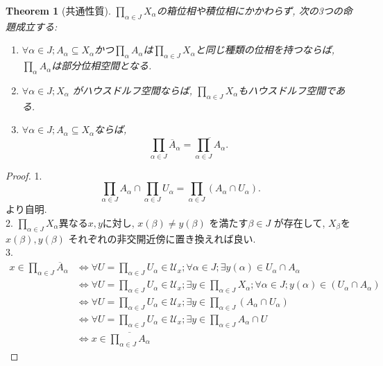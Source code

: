 \documentclass[lualatex]{ltjsbook}
\newcommand{\cl}[1]{\overline{ #1}  }
\newtheorem{theorem}{Theorem}[chapter]
\theoremstyle{remark}
\theoremstyle{plain}
\begin{document}
\begin{theorem}[共通性質]
	$\prod_{\alpha \in J} X_{\alpha}  $の箱位相や積位相にかかわらず,  次の3つの命題成立する:
	\begin{enumerate}
		\item $\forall \alpha \in J; A_{\alpha} \subseteq X_{\alpha} $かつ$\prod_{\alpha} A_{\alpha}  $は$\prod_{\alpha \in J} X_{\alpha}  $と同じ種類の位相を持つならば,  $\prod_{\alpha} A_{\alpha}  $は部分位相空間となる.
		\item $\forall \alpha \in J; X_{\alpha}$ がハウスドルフ空間ならば,  $\prod_{\alpha \in J} X_{\alpha}  $もハウスドルフ空間である.
		\item $\forall \alpha \in J; A_{\alpha} \subseteq X_{\alpha}$ならば,  
			\[
			\prod_{\alpha \in J} \cl{A}_{\alpha} = \cl{\prod_{\alpha \in J} A_{\alpha}}    
			.\] 
	\end{enumerate}
\end{theorem}

\begin{proof}
	1.\[
\prod_{\alpha \in J} A_{\alpha}  \cap \prod_{\alpha \in J} U_{\alpha}  = \prod_{\alpha \in J}\left( A_{\alpha}  \cap U_{\alpha}	\right)
	.\] より自明.\\
	2. $\prod_{\alpha \in J} X_{\alpha}  $異なる$x, y$に対し,  $x(\beta) \neq y(\beta)$ を満たす$\beta \in J$ が存在して,  
	$X_{\beta}$を $x\left( \beta \right) ,  y\left( \beta \right) $ それぞれの非交開近傍に置き換えれば良い.\\
	3. 
	$$
	\begin{aligned}
		x \in \prod_{\alpha \in J} \cl{A}_{\alpha} & \iff \forall U = \prod_{\alpha \in J} U_{\alpha}   \in \mathcal{U}_x; \forall \alpha \in J ; \exists y(\alpha) \in U_{\alpha} \cap A_{\alpha}\\
   &\iff \forall U = \prod_{\alpha \in J} U_{\alpha} \in \mathcal{U}_x; \exists y \in \prod_{\alpha \in J} X_{\alpha}  ; \forall \alpha \in J; y(\alpha) \in \left( U_{\alpha} \cap  A_{\alpha} \right) \\
   &\iff \forall  U = \prod_{\alpha \in J} U_{\alpha} \in \mathcal{U}_x; \exists y \in \prod_{\alpha \in J} (A_{\alpha} \cap U_{\alpha}) \\
   &\iff \forall U = \prod_{\alpha \in J} U_{\alpha} \in \mathcal{U}_x; \exists y \in \prod_{\alpha \in J} A_{\alpha} \cap U \\
   &   \iff x \in \cl{\prod_{\alpha \in J} A_{\alpha}  }
	\end{aligned}
	$$

\end{proof}
\end{document}
